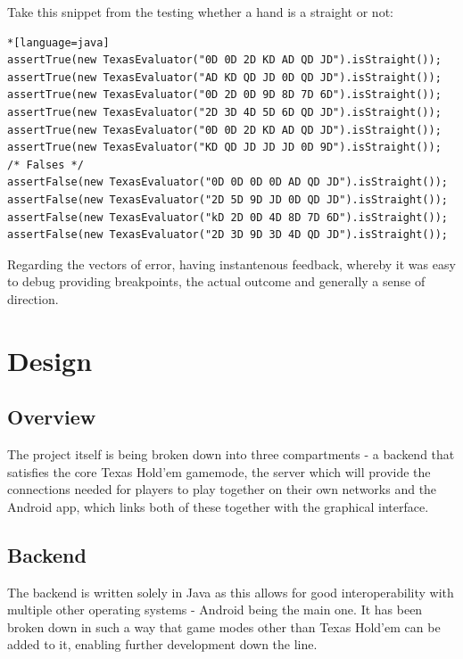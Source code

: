 \documentclass[11pt]{article}
\begin{document}
Take this snippet from the testing whether a hand is a straight or not: 

\begin{lstlisting}*[language=java]
assertTrue(new TexasEvaluator("0D 0D 2D KD AD QD JD").isStraight());
assertTrue(new TexasEvaluator("AD KD QD JD 0D QD JD").isStraight());
assertTrue(new TexasEvaluator("0D 2D 0D 9D 8D 7D 6D").isStraight());
assertTrue(new TexasEvaluator("2D 3D 4D 5D 6D QD JD").isStraight());
assertTrue(new TexasEvaluator("0D 0D 2D KD AD QD JD").isStraight());
assertTrue(new TexasEvaluator("KD QD JD JD JD 0D 9D").isStraight());
/* Falses */
assertFalse(new TexasEvaluator("0D 0D 0D 0D AD QD JD").isStraight());
assertFalse(new TexasEvaluator("2D 5D 9D JD 0D QD JD").isStraight());
assertFalse(new TexasEvaluator("kD 2D 0D 4D 8D 7D 6D").isStraight());
assertFalse(new TexasEvaluator("2D 3D 9D 3D 4D QD JD").isStraight());
\end{lstlisting}

Regarding the vectors of error, having instantenous feedback, whereby it was easy to debug providing breakpoints, the actual outcome and generally a sense of direction.



\section*{Design}

\subsection*{Overview}

The project itself is being broken down into three compartments - a backend that satisfies the core Texas Hold'em gamemode, the server which will provide the connections needed for players to play together on their own networks and the Android app, which links both of these together with the graphical interface. 

\subsection*{Backend}

The backend is written solely in Java as this allows for good interoperability with multiple other operating systems - Android being the main one. It has been broken down in such a way that game modes other than Texas Hold'em can be added to it, enabling further development down the line. 
\end{document}
